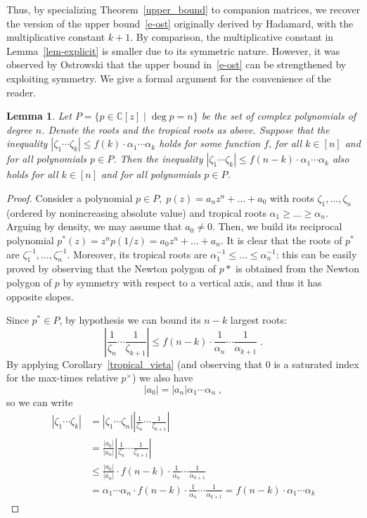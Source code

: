 \documentclass[a4paper]{amsart}
\theoremstyle{definition}
\theoremstyle{plain}
\newtheorem{lem}[thm]{Lemma}
\theoremstyle{remark}
\begin{document}
Thus, by specializing Theorem~\ref{upper_bound} to companion matrices, 
we recover the version of the upper bound~\eqref{e-ost} originally
derived by Hadamard, with the multiplicative constant $k+1$. By comparison,
the multiplicative constant in Lemma~\ref{lem-explicit} is smaller due
to its symmetric nature. However, it was observed by Ostrowski
that the upper bound in~\eqref{e-ost} can be strengthened
by exploiting symmetry. We give a formal argument
for the convenience of the reader.
\begin{lem}
	Let $P = \{ p \in {\mathbb{C}}[z] \mid \deg p =n\}$
	be the set of complex polynomials of degree $n$.
	Denote the roots and the tropical roots as above.
	Suppose that the inequality $|\zeta_1 \dotsm \zeta_k| {\leqslant} f(k)\cdot\alpha_1 \dotsm \alpha_k$
	holds for some function $f$, for all $k \in [n]$
	and for all polynomials $p \in P$.
	Then the inequality $|\zeta_1 \dotsm \zeta_k| {\leqslant} f(n-k) \cdot \alpha_1 \dotsm \alpha_k$
	also holds for all $k \in [n]$ and for all polynomials $p \in P$.
\end{lem}
\begin{proof}
Consider
a polynomial $p \in P, \; p(z) = a_n z^n + \dots + a_0$ 
	with roots $\zeta_1, \dots, \zeta_n$ (ordered by nonincreasing absolute value)
	and tropical roots $\alpha_1 {\geqslant} \dots {\geqslant} \alpha_n$.
Arguing by density, we may assume that $a_0\neq 0$. Then, 
we build its reciprocal polynomial $p^*(z) = z^n p(1/z) = a_0 z^n + \dots + a_n$.
	It is clear that the roots of $p^*$ are $\zeta_1^{-1}, \dots, \zeta_n^{-1}$.
	Moreover, its tropical roots are $\alpha_1^{-1} {\leqslant} \dots {\leqslant} \alpha_n^{-1}$:
	this can be easily proved by observing that the Newton polygon of $p*$
	is obtained from the Newton polygon of $p$ by symmetry with respect to a vertical axis,
	and thus it has opposite slopes.

	Since $p^* \in P$, by hypothesis we can bound its $n-k$ largest roots:
	\[
		\left| \frac{1}{\zeta_n} \dotsm \frac{1}{\zeta_{k+1}} \right|
		{\leqslant} f(n-k) \cdot \frac{1}{\alpha_n} \dotsm \frac{1}{\alpha_{k+1}} \; .
	\]
	By applying Corollary~\ref{tropical_vieta} (and observing that 
$0$ is a saturated index
for the max-times relative $p^\times$) we also have
	\[ |a_0| = |a_n| \alpha_1 \dotsm \alpha_n \; ,\]
	so we can write
	\[
	\begin{aligned}
		|\zeta_1 \dotsm \zeta_k| &= |\zeta_1 \dotsm \zeta_n| 
		\left| \frac{1}{\zeta_n} \dotsm \frac{1}{\zeta_{k+1}} \right| \\
		&= \frac{|a_0|}{|a_n|} \left| \frac{1}{\zeta_n} \dotsm \frac{1}{\zeta_{k+1}} \right| \\
		&{\leqslant} \frac{|a_0|}{|a_n|} \cdot f(n-k) \cdot \frac{1}{\alpha_n} \dotsm \frac{1}{\alpha_{k+1}} \\
		&= \alpha_1 \dotsm \alpha_n \cdot f(n-k) \cdot \frac{1}{\alpha_n} \dotsm \frac{1}{\alpha_{k+1}} 
		= f(n-k) \cdot \alpha_1 \dotsm \alpha_k
	\end{aligned}
	\]
\end{proof}
\end{document}
